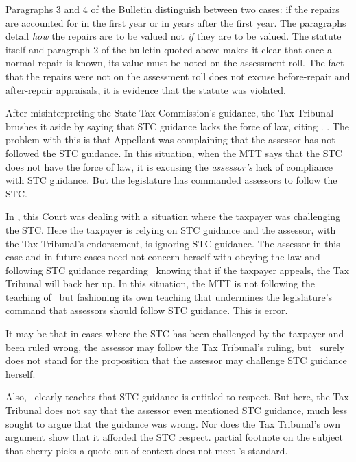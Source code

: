 \documentclass[12pt,\documentclassflag]{michiganCourtOfAppealsBrief}
\newcommand*\ruleline[1]{%
  \par\noindent%
  \raisebox{.8ex}{\makebox[\linewidth]{\hrulefill\hspace{1ex}%
      \raisebox{-.8ex}{#1}%
      \hspace{1ex}\hrulefill}}}%
\newenvironment{draft}{%
  \color{blue}%
  \ruleline{Begin Draft}
}{%
  \ruleline{End Draft}
  \color{black}%
}
\begin{document}
Paragraphs 3 and 4 of the Bulletin distinguish between two cases: if the repairs are accounted for in the first year or in years after the first year. The paragraphs detail \textit{how} the repairs are to be valued not \textit{if} they are to be valued. The statute itself and paragraph 2 of the bulletin quoted above makes it clear that once a normal repair is known, its value must be noted on the assessment roll. The fact that the repairs were not on the assessment roll does not excuse before-repair and after-repair appraisals, it is evidence that the statute was violated.

\begin{draft}
 
  \listoftodos
  After misinterpreting the State Tax Commission's guidance, the Tax Tribunal brushes it aside by saying that STC guidance lacks the force of law, citing \cite[s]{Rovas}. \foj[2]. The problem with this is that Appellant was complaining that the assessor has not followed the STC guidance. In this situation, when the MTT says that the STC does not have the force of law, it is excusing the \textit{assessor's} lack of compliance with STC guidance. But the legislature has commanded assessors to follow the STC.

  In \cite[s]{Rovas}, this Court was dealing with a situation where the taxpayer was challenging the STC. Here the taxpayer is relying on STC guidance and the assessor, with the Tax Tribunal's endorsement, is ignoring STC guidance. The assessor in this case and in future cases need not concern herself with obeying the law and following STC guidance regarding \mathieuGast\ knowing that if the taxpayer appeals, the Tax Tribunal will back her up. In this situation, the MTT is not following the teaching of \cite[s]{Rovas}\ but fashioning its own teaching that undermines the legislature's command that assessors should follow STC guidance. This is error.

  It may be that in cases where the STC has been challenged by the taxpayer and been ruled wrong, the assessor may follow the Tax Tribunal's ruling, but \cite[s]{Rovas}\ surely does not stand for the proposition that the assessor may challenge STC guidance herself.

  Also, \cite[s]{Rovas}\ clearly teaches that STC guidance is entitled to respect. But here, the Tax Tribunal does not say that the assessor even mentioned STC guidance, much less sought to argue that the guidance was wrong. Nor does the Tax Tribunal's own argument show that it afforded the STC respect. partial footnote on the subject that cherry-picks a quote out of context does not meet \cite[s]{Rovas}'s standard.


\end{draft}
\end{document}
